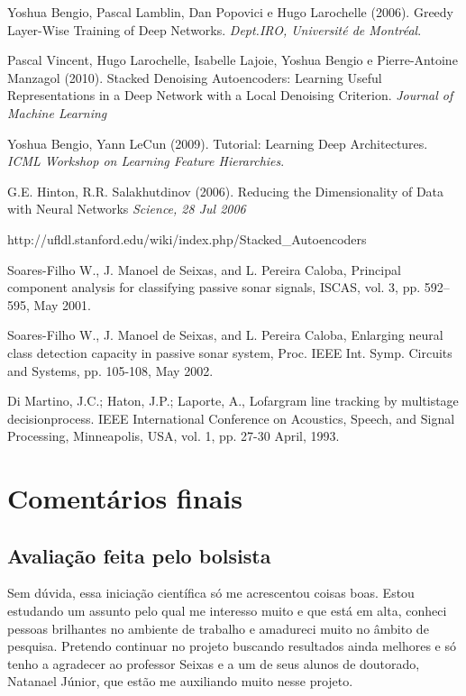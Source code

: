\documentclass[]{report}
\begin{document}
	\begin{thebibliography}{9}
		Yoshua Bengio, Pascal Lamblin, Dan Popovici e Hugo Larochelle (2006).
		Greedy Layer-Wise Training of Deep Networks.
		\textit{Dept.IRO, Université de Montréal}.
		
		Pascal Vincent, Hugo Larochelle, Isabelle Lajoie, Yoshua Bengio e Pierre-Antoine Manzagol (2010).
		Stacked Denoising Autoencoders: Learning Useful Representations in a Deep Network with a Local Denoising Criterion.
		\textit{Journal of Machine Learning}
		
		Yoshua Bengio, Yann LeCun (2009). 
		Tutorial: Learning Deep Architectures. 
		\textit{ICML Workshop on Learning Feature Hierarchies}.
		
		G.E. Hinton, R.R. Salakhutdinov (2006).
		Reducing the Dimensionality of Data with Neural Networks
		\textit{Science, 28 Jul 2006}
		
		http://ufldl.stanford.edu/wiki/index.php/Stacked\_Autoencoders

		Soares-Filho W., J. Manoel de Seixas, and L. Pereira Caloba, Principal component analysis for classifying passive sonar signals, ISCAS, vol. 3, pp. 592–595, May 2001.
		
		Soares-Filho W., J. Manoel de Seixas, and L. Pereira Caloba, Enlarging neural class detection capacity in passive sonar system, Proc. IEEE Int. Symp. Circuits and Systems, pp. 105-108, May 2002.
		
		Di Martino, J.C.; Haton, J.P.; Laporte, A., Lofargram line tracking by multistage decisionprocess. IEEE International Conference on Acoustics, Speech, and Signal Processing, Minneapolis, USA, vol. 1, pp. 27-30 April, 1993.

		
	\end{thebibliography}
	
	\chapter*{Comentários finais}
		\section*{Avaliação feita pelo bolsista}
		Sem dúvida, essa iniciação científica só me acrescentou coisas boas. Estou estudando um assunto pelo qual me interesso muito e que está em alta, conheci pessoas brilhantes no ambiente de trabalho e amadureci muito no âmbito de pesquisa. Pretendo continuar no projeto buscando resultados ainda melhores e só tenho a agradecer ao professor Seixas e a um de seus alunos de doutorado, Natanael Júnior, que estão me auxiliando muito nesse projeto.
		
		
\end{document}

